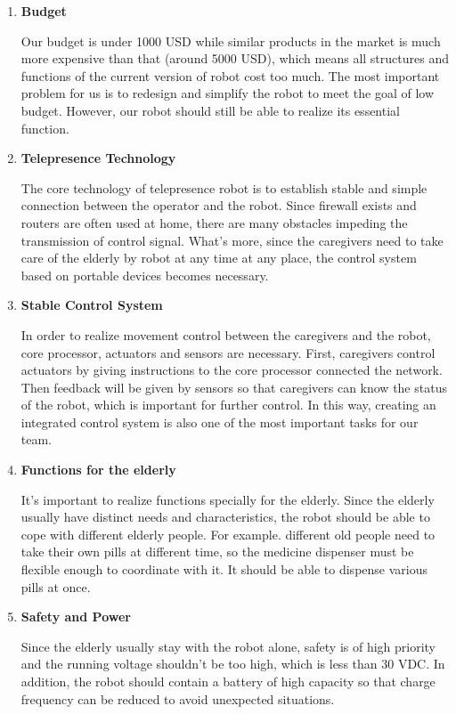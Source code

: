 \documentclass[12pt]{article}
\begin{document}
\begin{enumerate}[1]
\item \textbf{Budget}
\par Our budget is under 1000 USD while similar products in the market is much more expensive than that (around 5000 USD), which means all structures and functions of the current version of robot cost too much. The most important problem for us is to redesign and simplify the robot to meet the goal of low budget. However, our robot should still be able to realize its essential function.
\item \textbf{Telepresence Technology}
\par The core technology of telepresence robot is to establish stable and simple connection between the operator and the robot. Since firewall exists and routers are often used at home, there are many obstacles impeding the transmission of control signal. What's more, since the caregivers need to take care of the elderly by robot at any time at any place, the control system based on portable devices becomes necessary.
\item \textbf{Stable Control System} 
\par In order to realize movement control between the caregivers and the robot, core processor, actuators and sensors are necessary. First, caregivers control actuators by giving instructions to the core processor connected the network. Then feedback will be given by sensors so that caregivers can know the status of the robot, which is important for further control. In this way, creating an integrated control system is also one of the most important tasks for our team.
\item \textbf{Functions for the elderly}
\par It's important to realize functions specially for the elderly. Since the elderly usually have distinct needs and  characteristics, the robot should be able to cope with different elderly people. For example. different old people need to take their own pills at different time, so the medicine dispenser must be flexible enough to coordinate with it. It should be able to dispense various pills at once.
\item \textbf{Safety and Power}
\par Since the elderly usually stay with the robot alone, safety is of high priority and the running voltage shouldn't be too high, which is less than 30 VDC. In addition, the robot should contain a battery of high capacity so that charge frequency can be reduced to avoid unexpected situations.
\end{enumerate}
\end{document}

